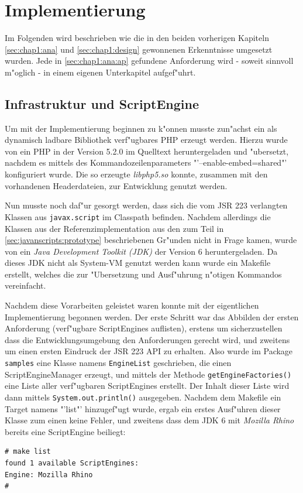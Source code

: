 
\section{Implementierung}
\label{sec:chap1:impl}

Im Folgenden wird beschrieben wie die in den beiden vorherigen Kapiteln \ref{sec:chap1:ana} und \ref{sec:chap1:design}
gewonnenen Erkenntnisse umgesetzt wurden. Jede in \ref{sec:chap1:ana:ap} gefundene Anforderung wird - soweit sinnvoll
m"oglich - in einem eigenen Unterkapitel aufgef"uhrt.

\subsection{Infrastruktur und ScriptEngine}
\label{sec:chap1:impl:1}

Um mit der Implementierung beginnen zu k"onnen musste zun"achst ein als dynamisch ladbare Bibliothek verf"ugbares
PHP erzeugt werden. Hierzu wurde von \cite{PHPHP} ein PHP in der Version 5.2.0 im Quelltext heruntergeladen und 
"ubersetzt, nachdem es mittels des Kommandozeilenparameters "'--enable-embed=shared"' konfiguriert wurde. Die so
erzeugte \emph{libphp5.so} konnte, zusammen mit den vorhandenen Headerdateien, zur Entwicklung genutzt werden.

Nun musste noch daf"ur gesorgt werden, dass sich die vom JSR 223 verlangten Klassen aus \texttt{javax.script} im
Classpath befinden. Nachdem allerdings die Klassen aus der Referenzimplementation aus den zum Teil in 
\ref{sec:javanscripts:prototype} beschriebenen Gr"unden nicht in Frage kamen, wurde von \cite{JAVAHP} ein
\emph{Java Development Toolkit (JDK)} der Version 6 heruntergeladen. Da dieses JDK nicht als System-VM genutzt
werden kann wurde ein Makefile erstellt, welches die zur "Ubersetzung und Ausf"uhrung n"otigen Kommandos
vereinfacht.

Nachdem diese Vorarbeiten geleistet waren konnte mit der eigentlichen Implementierung begonnen werden.
Der erste Schritt war das Abbilden der ersten Anforderung (verf"ugbare ScriptEngines auflisten), erstens um 
sicherzustellen dass die Entwicklungsumgebung den Anforderungen gerecht wird, und zweitens um einen ersten
Eindruck der JSR 223 API zu erhalten. Also wurde im Package \texttt{samples} eine Klasse namens
\texttt{EngineList} geschrieben, die einen ScriptEngineManager erzeugt, und mittels der Methode
\texttt{getEngineFactories()} eine Liste aller verf"ugbaren ScriptEngines erstellt. Der Inhalt dieser
Liste wird dann mittels \texttt{System.out.println()} ausgegeben. 
Nachdem dem Makefile ein Target namens "'list"' hinzugef"ugt wurde, ergab ein erstes Ausf"uhren dieser Klasse
zum einen keine Fehler, und zweitens dass dem JDK 6 mit \emph{Mozilla Rhino} bereits eine ScriptEngine beiliegt:
\begin{lstlisting}[caption=erste Tests]
# make list
found 1 available ScriptEngines:
Engine: Mozilla Rhino
#
\end{lstlisting}


